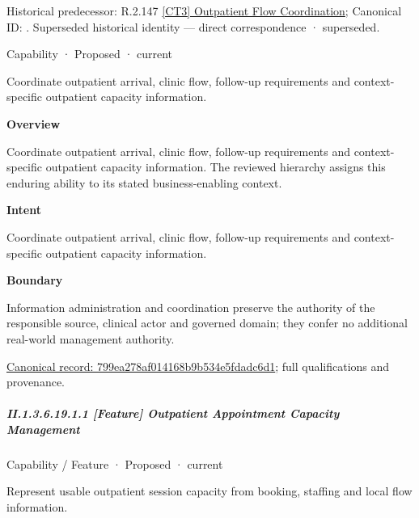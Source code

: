 {\small Historical predecessor: R.2.147 \hyperref[element:e6c59c7b72fe44169a5fdfd08a5e91c4]{[CT3] Outpatient Flow Coordination}; Canonical ID: \texttt{}. Superseded historical identity — direct correspondence · superseded.}\par
\label{element:799ea278af014168b9b534e5fdadc6d1}
{\small Capability · Proposed · current}\par

Coordinate outpatient arrival, clinic flow, follow-up requirements and context-specific outpatient capacity information.



\textbf{Overview}



Coordinate outpatient arrival, clinic flow, follow-up requirements and context-specific outpatient capacity information. The reviewed hierarchy assigns this enduring ability to its stated business-enabling context.



\textbf{Intent}



Coordinate outpatient arrival, clinic flow, follow-up requirements and context-specific outpatient capacity information.



\textbf{Boundary}



Information administration and coordination preserve the authority of the responsible source, clinical actor and governed domain; they confer no additional real-world management authority.


{\footnotesize \href{../../../../continuum/strategy/capability/799ea278af014168b9b534e5fdadc6d1.md}{Canonical record: 799ea278af014168b9b534e5fdadc6d1}; full qualifications and provenance.}\par
\subparagraph*{II.1.3.6.19.1.1 [Feature] Outpatient Appointment Capacity Management}
\label{navigation:II.1.3.6.19.1.1}

\label{element:3c4f8b0fc23044cbbac32602e1272680}
{\small Capability / Feature · Proposed · current}\par

Represent usable outpatient session capacity from booking, staffing and local flow information.



